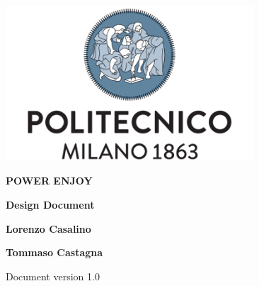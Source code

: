 \begin{titlepage}
	\begin{center}
		\includegraphics[width=350px]{../Datas/images/polimi.png}	
	                                                      
		\vspace*{2.0cm}

		{\Huge \textbf{POWER ENJOY}\par}
		
		\vspace*{1.0cm}

		{\LARGE \textbf{Design Document}\par}

		\vspace*{2.0cm}

		{\normalsize 
		\textbf{Lorenzo Casalino}\par
		\textbf{Tommaso Castagna}\par
		}

		\vfill
		Document version 1.0
	\end{center}
\end{titlepage}
